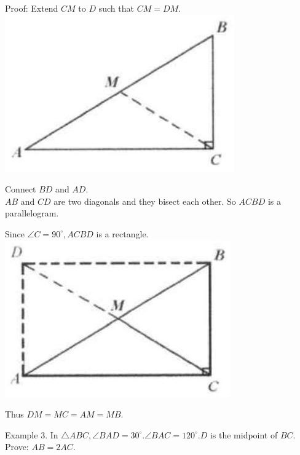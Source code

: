 \documentclass[10pt]{article}
\begin{document}
Proof:
Extend \(C M\) to \(D\) such that \(C M=D M\).\\
\includegraphics[max width=\textwidth, center]{2025_04_17_97bc1f7e44d93c271a88g-024(2)}

Connect \(B D\) and \(A D\).\\
\(A B\) and \(C D\) are two diagonals and they bisect each other. So \(A C B D\) is a parallelogram.

Since \(\angle C=90^{\circ}, A C B D\) is a rectangle.\\
\includegraphics[max width=\textwidth, center]{2025_04_17_97bc1f7e44d93c271a88g-024(1)}

Thus \(D M=M C=A M=M B\).

Example 3. In \(\triangle A B C, \angle B A D=30^{\circ} . \angle B A C=120^{\circ} . D\) is the midpoint of \(B C\). Prove: \(A B=2 A C\).
\end{document}
